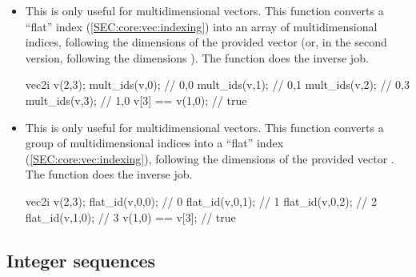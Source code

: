 \documentclass[12pt]{report}
\newenvironment{example}
{
    \begin{mdframed}[style=example,frametitle={Example}]
}
{
    \end{mdframed}
}
\begin{document}
\begin{itemize}
\item {} 


This is only useful for multidimensional vectors. This function converts a ``flat'' index  (\ref{SEC:core:vec:indexing}) into an array of multidimensional indices, following the dimensions of the provided vector  (or, in the second version, following the dimensions ). The  function does the inverse job.

\begin{example}
\begin{cppcode}
vec2i v(2,3);
mult_ids(v,0); // {0,0}
mult_ids(v,1); // {0,1}
mult_ids(v,2); // {0,3}
mult_ids(v,3); // {1,0}
v[3] == v(1,0); // true
\end{cppcode}
\end{example}

\item {} 

This is only useful for multidimensional vectors. This function converts a group of multidimensional indices into a ``flat'' index (\ref{SEC:core:vec:indexing}), following the dimensions of the provided vector . The  function does the inverse job.

\begin{example}
\begin{cppcode}
vec2i v(2,3);
flat_id(v,0,0); // 0
flat_id(v,0,1); // 1
flat_id(v,0,2); // 2
flat_id(v,1,0); // 3
v(1,0) == v[3]; // true
\end{cppcode}
\end{example}
\end{itemize}

\subsection{Integer sequences}
\end{document}
